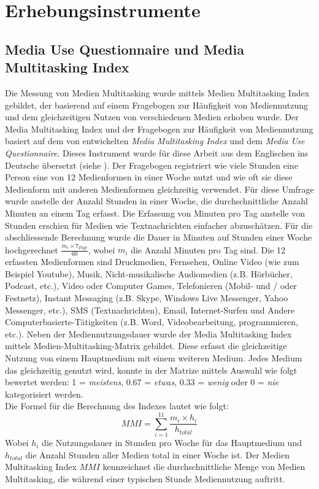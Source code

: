 \section{Erhebungsinstrumente}\label{section.erhebungsinstrumente}
\subsection{Media Use Questionnaire und Media Multitasking Index}\label{subsection.muq}
Die Messung von Medien Multitasking wurde mittels Medien Multitasking Index gebildet, der basierend auf einem Fragebogen zur Häufigkeit von Mediennutzung und dem gleichzeitigen Nutzen von verschiedenen Medien erhoben wurde. Der Media Multitasking Index und der Fragebogen zur Häufigkeit von Mediennutzung basiert auf dem von  entwickelten \textit{Media Multitasking Index} und dem \textit{Media Use Questionnaire}. Dieses Instrument wurde für diese Arbeit aus dem Englischen ins Deutsche übersetzt (siehe ). Der Fragebogen registriert wie viele Stunden eine Person eine von 12 Medienformen in einer Woche nutzt und wie oft sie diese Medienform mit anderen Medienformen gleichzeitig verwendet. Für diese Umfrage wurde anstelle der Anzahl Stunden in einer Woche, die durchschnittliche Anzahl Minuten an einem Tag erfasst. Die Erfassung von Minuten pro Tag anstelle von Stunden erschien für Medien wie Textnachrichten einfacher abzuschätzen. Für die abschliessende Berechnung wurde die Dauer in Minuten auf Stunden einer Woche hochgerechnet \(\frac{m_{i} \times 7_{Tage}}{60}\), wobei \(m_{i}\) die Anzahl Minuten pro Tag sind. Die 12 erfassten Medienformen sind Druckmedien, Fernsehen, Online Video (wie zum Beispiel Youtube), Musik, Nicht-musikalische Audiomedien (z.B. Hörbücher, Podcast, etc.), Video oder Computer Games, Telefonieren (Mobil- und / oder Festnetz), Instant Messaging (z.B. Skype, Windows Live Messenger, Yahoo Messenger, etc.), SMS (Textnachrichten), Email, Internet-Surfen und Andere Computerbasierte-Tätigkeiten (z.B. Word, Videobearbeitung, programmieren, etc.). Neben der Mediennutzungsdauer wurde der Media Multitasking Index mittels Medien-Multitasking-Matrix gebildet. Diese erfasst die gleichzeitige Nutzung von einem Hauptmedium mit einem weiteren Medium. Jedes Medium das gleichzeitig genutzt wird, konnte in der Matrize mittels Auswahl wie folgt bewertet werden: 1 = \textit{meistens}, 0.67 = \textit{etwas}, 0.33 = \textit{wenig} oder 0 = \textit{nie} kategorisiert werden.\\
Die Formel für die Berechnung des Indexes lautet wie folgt:
\begin{equation}\label{formula.mmi}
    MMI=\sum_{i=1}^{11} \frac{m_{i} \times h_{i}}{h_{total}}
\end{equation}
Wobei \(h_{i}\) die Nutzungsdauer in Stunden pro Woche für das Hauptmedium und \(h_{total}\) die Anzahl Stunden aller Medien total in einer Woche ist.  Der Medien Multitasking Index \(MMI\) kennzeichnet die durchschnittliche Menge von Medien Multitasking, die während einer typischen Stunde Mediennutzung auftritt.
  
